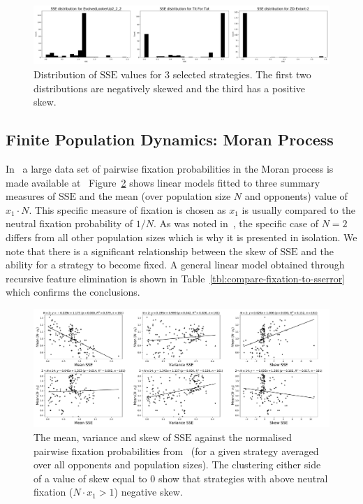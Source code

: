 \documentclass[a4paper]{article}
\newcommand{\SSe}{\text{SSE}}
\begin{document}
\begin{figure}[!hbtp]
    \centering
    \includegraphics[width=\textwidth]{./assets/img/sserror_distribution_for_selection_of_strategies/main.pdf}
    \caption{Distribution of \(\SSe\) values for 3 selected strategies. The
    first two distributions are negatively skewed and the third has a positive
    skew.}
    \label{fig:sserror_distribution_for_selection_of_strategies}
\end{figure}

\subsection{Finite Population Dynamics: Moran Process}

In~\cite{Moran1707} a large data set of pairwise fixation probabilities in the
Moran process is made available at~\cite{vincent_knight_2017_1040129}
Figure~\ref{fig:compare-fixation-to-sserror} shows linear models fitted to three
summary measures of \(\SSe\) and the mean (over population size \(N\) and
opponents) value of \(x_1\cdot N\). This specific measure of fixation is chosen
as \(x_1\) is usually compared to the neutral fixation probability of \(1 / N\).
As was noted in~\cite{Moran1707}, the specific case of \(N=2\) differs from all
other population sizes which is why it is presented in isolation. 
We note that there is a significant relationship between the skew of
\(\SSe\) and the ability for a strategy to become fixed.
A general linear model obtained through recursive feature elimination is shown
in Table~\ref{tbl:compare-fixation-to-sserror} which confirms the conclusions.

\begin{figure}[!hbtp]
    \centering
    \includegraphics[width=\textwidth]{./assets/img/compare-fixation-to-sserror/main.pdf}
    \caption{The mean, variance and skew of
    \(\SSe\) against the normalised pairwise fixation probabilities
    from~\cite{Moran1707} (for a given strategy averaged over all opponents and
    population sizes). The clustering either side of a value of skew equal to
    0 show that strategies with above neutral
    fixation (\(N\cdot x_1>1\)) negative skew.}
    \label{fig:compare-fixation-to-sserror}
\end{figure}
\end{document}
